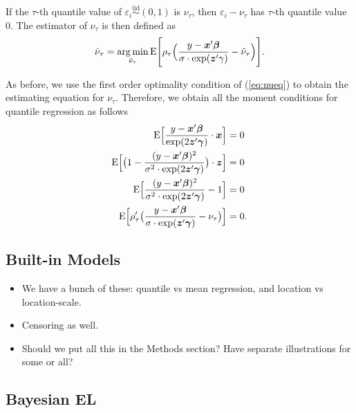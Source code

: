 \documentclass[article]{jss}
\renewcommand{\|}{\,|\,}
\begin{document}
If the \(\tau\)-th quantile value of \(\varepsilon_i\stackrel {\textrm{iid}}{\sim}(0,1)\) is \(\nu_{\tau}\), then \(\varepsilon_i-\nu_{\tau}\) has \(\tau\)-th quantile value \(0\). The estimator of \(\nu_{\tau}\) is then defined as
\begin{equation}\label{eq:nueq}
  \hat\nu_{\tau} = \mathop{\mathrm{arg\,min}}_{\tilde\nu_{\tau}} \textrm{E}\Biggl[\rho_{\tau}\Bigl(\frac{y-\bm x'\bm \beta}{\sigma\cdot\exp(\bm z'\gamma)}-\tilde\nu_{\tau}\Bigr)\Biggr].
\end{equation}

As before, we use the first order optimality condition of (\ref{eq:nueq}) to obtain the estimating equation for \(\nu_{\tau}\). Therefore, we obtain all the moment conditions for quantile regression as follows
\begin{equation} \label{eq:qrls}
\begin{split}
  \textrm{E}\Bigl[\frac{y-\bm x'\bm \beta}{\exp(2\bm z'\bm \gamma)}\cdot\bm x\Bigr] &= 0 \\
  \textrm{E}\Bigl[\bigl(1-\frac{(y-\bm x'\bm \beta)^2}{\sigma^2\cdot\exp(2\bm z'\bm \gamma)}\bigr)\cdot\bm z\Bigr] &= 0 \\
  \textrm{E}\Bigl[\frac{(y-\bm x'\bm \beta)^2}{\sigma^2\cdot\exp(2\bm z'\bm \gamma)}-1\Bigr] &= 0 \\
  \textrm{E}\Bigl[\rho'_{\tau}\bigl(\frac{y-\bm x'\bm \beta}{\sigma\cdot\exp(\bm z'\bm \gamma)}-\nu_{\tau}\bigr)\Bigr] &= 0.
\end{split}
\end{equation}

\hypertarget{built-in-models}{%
\subsection{Built-in Models}\label{built-in-models}}

\begin{itemize}
\item
  We have a bunch of these: quantile vs mean regression, and location vs location-scale.
\item
  Censoring as well.
\item
  Should we put all this in the Methods section? Have separate illustrations for some or all?
\end{itemize}

\hypertarget{bayesian-el}{%
\subsection{Bayesian EL}\label{bayesian-el}}
\end{document}
